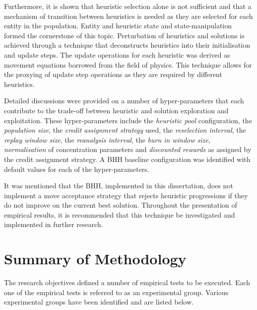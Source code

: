 Furthermore, it is shown that heuristic selection alone is not sufficient and that a mechanism of transition between heuristics is needed as they are selected for each entity in the population. Entity and heuristic state and state-manipulation formed the cornerstone of this topic. Perturbation of heuristics and solutions is achieved through a technique that deconstructs heuristics into their initialisation and update steps. The update operations for each heuristic was derived as movement equations borrowed from the field of physics. This technique allows for the proxying of update step operations as they are required by different heuristics.

Detailed discussions were provided on a number of hyper-parameters that each contribute to the trade-off between heuristic and solution exploration and exploitation. These hyper-parameters include the \textit{heuristic pool} configuration, the \textit{population size}, the \textit{credit assignment strategy} used, the \textit{reselection interval}, the \textit{replay window size}, the \textit{reanalysis interval}, the \textit{burn in window size}, \textit{normalisation} of concentration parameters and \textit{discounted rewards} as assigned by the credit assignment strategy. A \acs{BHH} baseline configuration was identified with default values for each of the hyper-parameters.

It was mentioned that the \acs{BHH}, implemented in this dissertation, does not implement a move acceptance strategy that rejects heuristic progressions if they do not improve on the current best solution. Throughout the presentation of empirical results, it is recommended that this technique be investigated and implemented in further research.


\section{Summary of Methodology}
\label{sec:conclusion:methodology}

The research objectives defined a number of empirical tests to be executed. Each one of the empirical tests is referred to as an experimental group. Various experimental groups have been identified and are listed below.

